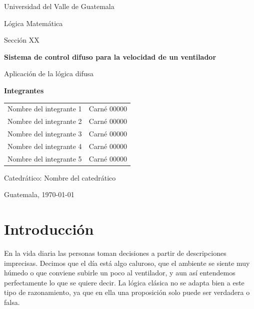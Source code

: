 \documentclass[11pt]{article}
\begin{document}
\begin{titlepage}
\centering
{\Large Universidad del Valle de Guatemala\par}
\vspace{0.4cm}
{\large Lógica Matemática\par}
\vspace{0.2cm}
{\large Sección XX\par} %
\vfill
{\LARGE\bfseries Sistema de control difuso para la velocidad de un ventilador\par}
\vspace{0.6cm}
{\large Aplicación de la lógica difusa\par}
\vfill
{\large\bfseries Integrantes\par}
\vspace{0.3cm}
{\large
\begin{tabular}{ll}
Nombre del integrante 1 & Carné 00000 \\
Nombre del integrante 2 & Carné 00000 \\
Nombre del integrante 3 & Carné 00000 \\
Nombre del integrante 4 & Carné 00000 \\
Nombre del integrante 5 & Carné 00000 \\
\end{tabular}\par}
\vfill
{\large Catedrático: Nombre del catedrático\par} %
\vspace{0.6cm}
{\large Guatemala, \today\par}
\end{titlepage}

\tableofcontents
\newpage

\section{Introducción}

En la vida diaria las personas toman decisiones a partir de descripciones imprecisas. Decimos que el día está algo caluroso, que el ambiente se siente muy húmedo o que conviene subirle un poco al ventilador, y aun así entendemos perfectamente lo que se quiere decir. La lógica clásica no se adapta bien a este tipo de razonamiento, ya que en ella una proposición solo puede ser verdadera o falsa.
\end{document}
